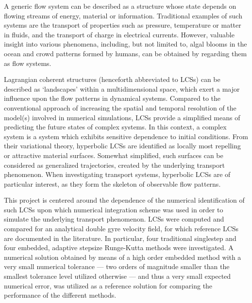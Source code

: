 A generic flow system can be described as a structure whose state depends on
flowing streams of energy, material or information. Traditional examples of
such systems are the transport of properties such as pressure, temperature or
matter in fluids, and the transport of charge in electrical currents. However,
valuable insight into various phenomena, including, but not limited to,
algal blooms in the ocean and crowd patterns formed by humans, can
be obtained by regarding them as flow systems.

Lagrangian coherent structures (henceforth abbreviated to LCSs) can be described
as `landscapes' within a multidimensional space, which exert a major influence
upon the flow patterns in dynamical systems.
Compared to the conventional approach of increasing the spatial and temporal
resolution of the model(s) involved in numerical simulations, LCSs provide a
simplified means of predicting the future states of complex systems. In this
context, a complex system is a system which exhibits sensitive dependence
to initial conditions.
From their variational theory, hyperbolic LCSs are identified as locally most
repelling or attractive material surfaces. Somewhat simplified, such surfaces
can be considered as generalized trajectories, created by the underlying
transport phenomenon. When investigating transport systems, hyperbolic LCSs are
of particular interest, as they form the skeleton of observable flow patterns.

This project is centered around the dependence of the numerical identification
of such LCSs upon which numerical integration scheme was used in order to
simulate the underlying transport phenomenon.
LCSs were computed and compared for an analytical double gyre velocity
field, for which reference LCSs are documented in the literature. In particular,
four traditional singlestep and four embedded, adaptive stepsize Runge-Kutta
methods were investigated. A numerical solution obtained by means of a high
order embedded method with a very small numerical tolerance --- two orders of
magnitude smaller than the smallest tolerance level utilized otherwise ---
and thus a very small expected numerical error, was utilized as a reference
solution for comparing the performance of the different methods.

